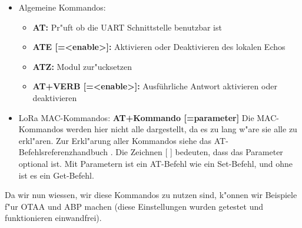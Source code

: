  \begin{itemize}
 	\item Algemeine Kommandos: 
 	\begin{itemize}
 		\item \textbf{AT:} Pr"uft ob die UART Schnittstelle benutzbar ist
 		\item \textbf{ATE [=<enable>]:}  Aktivieren oder Deaktivieren des lokalen Echos
 		\item \textbf{ATZ:} Modul zur"ucksetzen
 		\item \textbf{AT+VERB [=<enable>]:} Ausführliche Antwort aktivieren oder deaktivieren 
 	\end{itemize}
 	\item LoRa MAC-Kommandos: \textbf{AT+Kommando [=parameter]}
 	Die MAC-Kommandos werden hier nicht alle dargestellt, da es zu lang w"are sie alle zu erkl"aren. Zur Erkl"arung aller Kommandos siehe das AT-Befehlsreferenzhandbuch \cite{AT_Command}.
 	Die Zeichnen [ ] bedeuten, dass das Parameter optional ist. Mit Parametern ist ein AT-Befehl wie ein Set-Befehl, und ohne ist es ein Get-Befehl.
 \end{itemize}  

Da wir nun wiessen, wir diese Kommandos zu nutzen sind, k"onnen wir Beispiele f"ur OTAA und ABP machen (diese Einstellungen wurden getestet und funktionieren einwandfrei).

